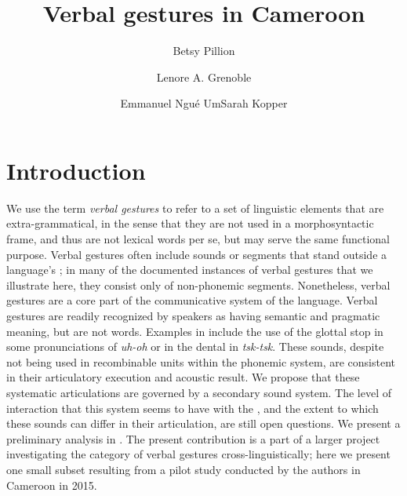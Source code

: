 \documentclass[output=paper
,newtxmath
,modfonts
,nonflat]{langsci/langscibook}
\author{Betsy Pillion\affiliation{University of Chicago}\and Lenore A. Grenoble\affiliation{University of Chicago}\and Emmanuel Ngu{\'e} Um\affiliation{University of Yaound{\'e}}\lastand Sarah Kopper\affiliation{Michigan State University}}
\title{Verbal gestures in Cameroon}
\begin{document}
\maketitle

\section{Introduction}

We use the term \textit{verbal gestures} to refer to a set of linguistic elements that  are extra-grammatical, in the sense that they are not used in a morphosyntactic frame, and thus are not lexical words per se, but may serve the same functional purpose. Verbal gestures  often include sounds or segments that stand outside a language's ; in many of the documented instances of verbal gestures that we illustrate here, they consist only of non-phonemic segments. Nonetheless, verbal gestures are a core part of the communicative system of the language.  Verbal gestures are readily recognized by speakers as having semantic and pragmatic meaning, but are not words. Examples in  include the use of the glottal stop in some pronunciations of \textit{uh-oh} or in the dental  in \textit{tsk-tsk}. These sounds, despite not being used in recombinable units within the phonemic system, are consistent in their articulatory execution and acoustic result. We propose that these systematic articulations are governed by a secondary sound system. The level of interaction that this system seems to have with the , and the extent to which these sounds can differ in their articulation, are still open questions. We present a preliminary analysis in . The present contribution is a part of a larger project investigating the category of verbal gestures cross-linguistically; here we present one small subset resulting from a pilot study conducted by the authors in Cameroon in 2015.
\end{document}

